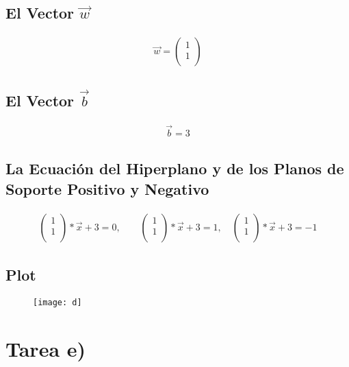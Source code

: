 \documentclass[fleqn]{llncs}
\begin{document}
\subsection{El Vector $\overrightarrow{w}$}
\begin{align*}
	\overrightarrow{w} =
	\begin{pmatrix}
		1 \\
		1 \\
	\end{pmatrix}
\end{align*}

\subsection{El Vector $\overrightarrow{b}$}
\begin{align*}
	\overrightarrow{b} = 3
\end{align*}

\subsection{La Ecuación del Hiperplano y de los Planos de Soporte Positivo y Negativo}
\begin{align*}
	\begin{pmatrix}
		1 \\
		1 \\
	\end{pmatrix} * \overrightarrow{x} + 3 = 0,
	\qquad
	\begin{pmatrix}
		1 \\
		1 \\
	\end{pmatrix} * \overrightarrow{x} + 3 = 1,
	\quad
	\begin{pmatrix}
		1 \\
		1 \\
	\end{pmatrix} * \overrightarrow{x} + 3 = -1
\end{align*}

\newpage

\subsection{Plot}
\begin{figure}[H]
	\centering
	\texttt{[image: d]}
\end{figure}

\newpage

\section{Tarea e)}
\end{document}
